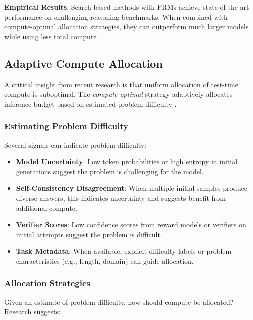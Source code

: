 \textbf{Empirical Results}: Search-based methods with PRMs achieve state-of-the-art performance on challenging reasoning benchmarks. When combined with compute-optimal allocation strategies, they can outperform much larger models while using less total compute \citep{snell2024scaling}.

\subsection{Adaptive Compute Allocation}

A critical insight from recent research is that uniform allocation of test-time compute is suboptimal. The \textit{compute-optimal} strategy adaptively allocates inference budget based on estimated problem difficulty \citep{snell2024scaling}.

\subsubsection{Estimating Problem Difficulty}

Several signals can indicate problem difficulty:

\begin{itemize}
    \item \textbf{Model Uncertainty}: Low token probabilities or high entropy in initial generations suggest the problem is challenging for the model.
    
    \item \textbf{Self-Consistency Disagreement}: When multiple initial samples produce diverse answers, this indicates uncertainty and suggests benefit from additional compute.
    
    \item \textbf{Verifier Scores}: Low confidence scores from reward models or verifiers on initial attempts suggest the problem is difficult.
    
    \item \textbf{Task Metadata}: When available, explicit difficulty labels or problem characteristics (e.g., length, domain) can guide allocation.
\end{itemize}

\subsubsection{Allocation Strategies}

Given an estimate of problem difficulty, how should compute be allocated? Research suggests:


